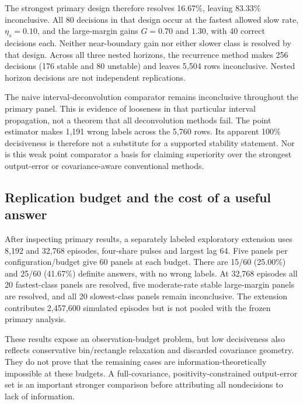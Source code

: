 \documentclass[11pt,a4paper]{article}
\theoremstyle{definition}
\theoremstyle{remark}
\begin{document}
The strongest primary design therefore resolves 16.67\%, leaving 83.33\% inconclusive. All 80 decisions in that design occur at the fastest allowed slow rate, $\eta_s=0.10$, and the large-margin gains $G=0.70$ and $1.30$, with 40 correct decisions each. Neither near-boundary gain nor either slower class is resolved by that design. Across all three nested horizons, the recurrence method makes 256 decisions (176 stable and 80 unstable) and leaves 5,504 rows inconclusive. Nested horizon decisions are not independent replications.

The naive interval-deconvolution comparator remains inconclusive throughout the primary panel. This is evidence of looseness in that particular interval propagation, not a theorem that all deconvolution methods fail. The point estimator makes 1,191 wrong labels across the 5,760 rows. Its apparent 100\% decisiveness is therefore not a substitute for a supported stability statement. Nor is this weak point comparator a basis for claiming superiority over the strongest output-error or covariance-aware conventional methods.

\subsection{Replication budget and the cost of a useful answer}
After inspecting primary results, a separately labeled exploratory extension uses 8,192 and 32,768 episodes, four-share pulses and largest lag 64. Five panels per configuration/budget give 60 panels at each budget. There are 15/60 (25.00\%) and 25/60 (41.67\%) definite answers, with no wrong labels. At 32,768 episodes all 20 fastest-class panels are resolved, five moderate-rate stable large-margin panels are resolved, and all 20 slowest-class panels remain inconclusive. The extension contributes 2,457,600 simulated episodes but is not pooled with the frozen primary analysis.

These results expose an observation-budget problem, but low decisiveness also reflects conservative bin/rectangle relaxation and discarded covariance geometry. They do not prove that the remaining cases are information-theoretically impossible at these budgets. A full-covariance, positivity-constrained output-error set is an important stronger comparison before attributing all nondecisions to lack of information.
\end{document}
